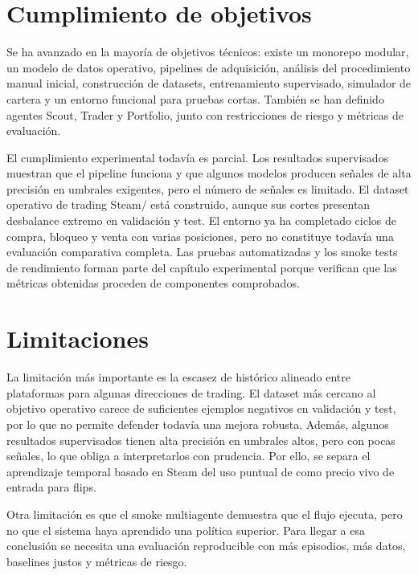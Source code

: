 \section{Cumplimiento de objetivos}

Se ha avanzado en la mayoría de objetivos técnicos: existe un monorepo modular, un modelo de datos operativo, pipelines de adquisición, análisis del procedimiento manual inicial, construcción de datasets, entrenamiento supervisado, simulador de cartera y un entorno  funcional para pruebas cortas. También se han definido agentes Scout, Trader y Portfolio, junto con restricciones de riesgo y métricas de evaluación.

El cumplimiento experimental todavía es parcial. Los resultados supervisados muestran que el pipeline funciona y que algunos modelos producen señales de alta precisión en umbrales exigentes, pero el número de señales es limitado. El dataset operativo de trading Steam/ está construido, aunque sus cortes presentan desbalance extremo en validación y test. El entorno  ya ha completado ciclos de compra, bloqueo y venta con varias posiciones, pero no constituye todavía una evaluación comparativa completa. Las pruebas automatizadas y los smoke tests de rendimiento forman parte del capítulo experimental porque verifican que las métricas obtenidas proceden de componentes comprobados.

\section{Limitaciones}

La limitación más importante es la escasez de histórico alineado entre plataformas para algunas direcciones de trading. El dataset más cercano al objetivo operativo carece de suficientes ejemplos negativos en validación y test, por lo que no permite defender todavía una mejora robusta. Además, algunos resultados supervisados tienen alta precisión en umbrales altos, pero con pocas señales, lo que obliga a interpretarlos con prudencia. Por ello, se separa el aprendizaje temporal basado en Steam del uso puntual de  como precio vivo de entrada para flips.

Otra limitación es que el smoke multiagente demuestra que el flujo ejecuta, pero no que el sistema haya aprendido una política superior. Para llegar a esa conclusión se necesita una evaluación reproducible con más episodios, más datos, baselines justos y métricas de riesgo.


